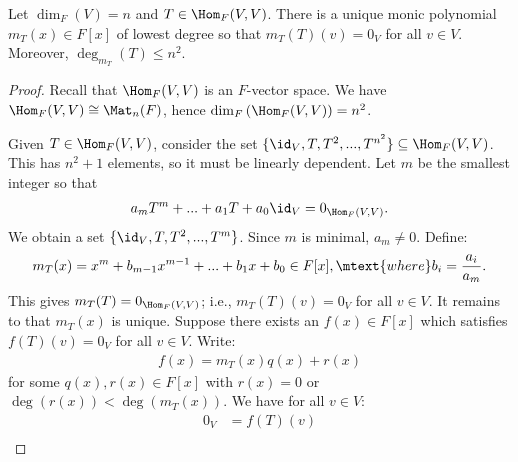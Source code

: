    \begin{theorem}
        Let $\dim_F{(V)} = n$ and $T \in \Hom_F{(V,V)}$. There is a unique monic polynomial $m_T(x) \in F[x]$ of lowest degree so that $m_T(T)(v) = 0_V$ for all $v \in V$. Moreover, $\deg_{m_T}{(T)}\leq n^2$.
    \end{theorem}
        \begin{proof}
            Recall that $\Hom_F{(V,V)}$ is an $F$-vector space. We have $\Hom_F{(V,V)} \cong \Mat_n{(F)}$, hence $\dim_F{(\Hom_F{(V,V)})} = n^2$.

            Given $T \in \Hom_F{(V,V)}$, consider the set $\{\id_V,T,T^2,...,T^{n^2}\} \subseteq \Hom_F{(V,V)}$. This has $n^2 + 1$ elements, so it must be linearly dependent. Let $m$ be the smallest integer so that
                \begin{equation*}
                \begin{split}
                    a_mT^m + ... + a_1T + a_0 \id_V = 0_{\Hom_F{(V,V)}}.
                \end{split}
                \end{equation*}
            We obtain a set $\{\id_V,T,T^2,...,T^m\}$. Since $m$ is minimal, $a_m \neq 0$. Define:
                \begin{equation*}
                \begin{split}
                    m_T(x) = x^m + b_{m-1}x^{m-1} + ... + b_1x + b_0 \in F[x], \mtext{where} b_i = \frac{a_i}{a_m}.
                \end{split}
                \end{equation*}
            This gives $m_T(T) = 0_{\Hom_F{(V,V)}}$; i.e., $m_T(T)(v) = 0_V$ for all $v \in V$. 
                It remains to that $m_T(x)$ is unique. Suppose there exists an $f(x) \in F[x]$ which satisfies $f(T)(v) = 0_V$ for all $v \in V$. Write:
                    \begin{equation*}
                    \begin{split}
                        f(x) = m_T(x)q(x) + r(x)
                    \end{split}
                    \end{equation*}
                for some $q(x), r(x) \in F[x]$ with $r(x) = 0$ or $\deg{(r(x))} < \deg{(m_T(x))}$. We have for all $v \in V$:
                    \begin{equation*}
                    \begin{split}
                        0_V
                        & = f(T)(v) \\

\end{split}
\end{equation*}
\end{proof}

